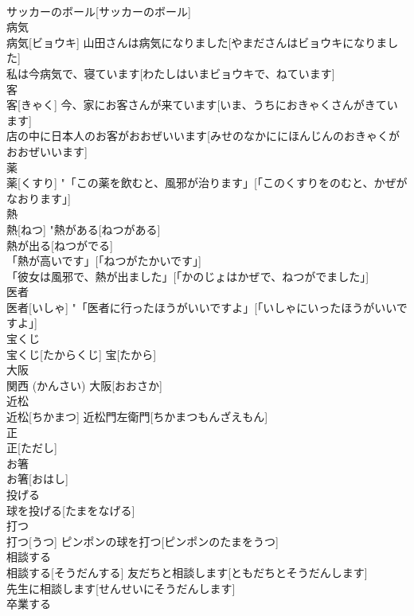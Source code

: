 \documentclass[8pt]{extreport}
\begin{document}
\begin{CJK}{UTF8}{min}
\\	サッカーのボール[サッカーのボール] 
\\	病気	
\\	病気[ビョウキ]	山田さんは病気になりました[やまださんはビョウキになりました] 
\\	私は今病気で、寝ています[わたしはいまビョウキで、ねています] 
\\	客	
\\	客[きゃく]	今、家にお客さんが来ています[いま、うちにおきゃくさんがきています] 
\\	店の中に日本人のお客がおおぜいいます[みせのなかににほんじんのおきゃくがおおぜいいます] 
\\	薬	
\\	薬[くすり]	"「この薬を飲むと、風邪が治ります」[「このくすりをのむと、かぜがなおります」] 
\\	熱	
\\	熱[ねつ]	"熱がある[ねつがある] 
\\	熱が出る[ねつがでる] 
\\	「熱が高いです」[「ねつがたかいです」] 
\\	「彼女は風邪で、熱が出ました」[「かのじょはかぜで、ねつがでました」] 
\\	医者	
\\	医者[いしゃ]	"「医者に行ったほうがいいですよ」[「いしゃにいったほうがいいですよ」] 
\\	宝くじ	
\\	宝くじ[たからくじ]	宝[たから] 
\\	大阪	
\\	関西 (かんさい)	大阪[おおさか]	
\\	近松	
\\	近松[ちかまつ]	近松門左衛門[ちかまつもんざえもん] 
\\	正	
\\	正[ただし]	
\\	お箸	
\\	お箸[おはし]	
\\	投げる	
\\	[一段, 
\\	投げる[なげる]	球を投げる[たまをなげる] 
\\	打つ	
\\	打つ[うつ]	ピンポンの球を打つ[ピンポンのたまをうつ] 
\\	相談する	
\\	[不規則]	相談する[そうだんする]	友だちと相談します[ともだちとそうだんします] 
\\	先生に相談します[せんせいにそうだんします] 
\\	卒業する	

\end{CJK}
\end{document}
